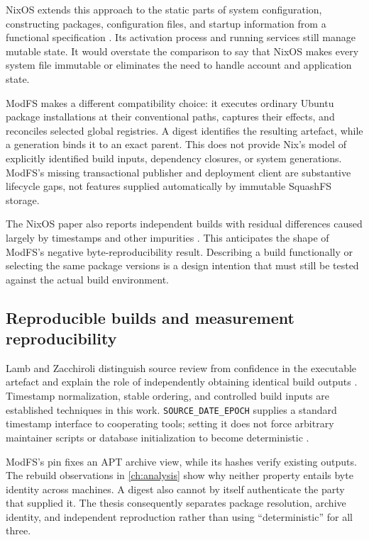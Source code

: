 NixOS extends this approach to the static parts of system configuration, constructing packages, configuration files, and startup information from a functional specification \autocite{dolstra2008nixos}. Its activation process and running services still manage mutable state. It would overstate the comparison to say that NixOS makes every system file immutable or eliminates the need to handle account and application state.

ModFS makes a different compatibility choice: it executes ordinary Ubuntu package installations at their conventional paths, captures their effects, and reconciles selected global registries. A digest identifies the resulting artefact, while a generation binds it to an exact parent. This does not provide Nix's model of explicitly identified build inputs, dependency closures, or system generations. ModFS's missing transactional publisher and deployment client are substantive lifecycle gaps, not features supplied automatically by immutable SquashFS storage.

The NixOS paper also reports independent builds with residual differences caused largely by timestamps and other impurities \autocite[\S~6.2]{dolstra2008nixos}. This anticipates the shape of ModFS's negative byte-reproducibility result. Describing a build functionally or selecting the same package versions is a design intention that must still be tested against the actual build environment.

\subsection{Reproducible builds and measurement reproducibility}

Lamb and Zacchiroli distinguish source review from confidence in the executable artefact and explain the role of independently obtaining identical build outputs \autocite{lamb2022reproducible}. Timestamp normalization, stable ordering, and controlled build inputs are established techniques in this work. \texttt{SOURCE\_DATE\_EPOCH} supplies a standard timestamp interface to cooperating tools; setting it does not force arbitrary maintainer scripts or database initialization to become deterministic \autocite{source-date-epoch}.

ModFS's pin fixes an \ac{APT} archive view, while its hashes verify existing outputs. The rebuild observations in \cref{ch:analysis} show why neither property entails byte identity across machines. A digest also cannot by itself authenticate the party that supplied it. The thesis consequently separates package resolution, archive identity, and independent reproduction rather than using ``deterministic'' for all three.

